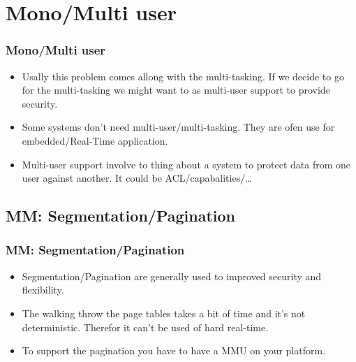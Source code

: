 \section{Mono/Multi user}
\begin{frame}
  \frametitle{Mono/Multi user}
  \begin{itemize}
        \item Usally this problem comes allong with the multi-tasking.
        If we decide to go for the multi-tasking we might want to as
        multi-user support to provide security.
        \item Some systems don't need multi-user/multi-tasking. They are
        ofen use for embedded/Real-Time application.
        \item Multi-user support involve to thing about a system to
        protect data from one user against another. It could be
        ACL/capabalities/\ldots
  \end{itemize}
\end{frame}


\subsection{MM: Segmentation/Pagination}
\begin{frame}
  \frametitle{MM: Segmentation/Pagination}
  \begin{itemize}
        \item Segmentation/Pagination are generally used to improved
        security and flexibility.
        \item The walking throw the page tables takes a bit of time and
        it's not deterministic. Therefor it can't be used of hard
        real-time.
        \item To support the pagination you have to have a MMU on your
        platform.
  \end{itemize}
\end{frame}

